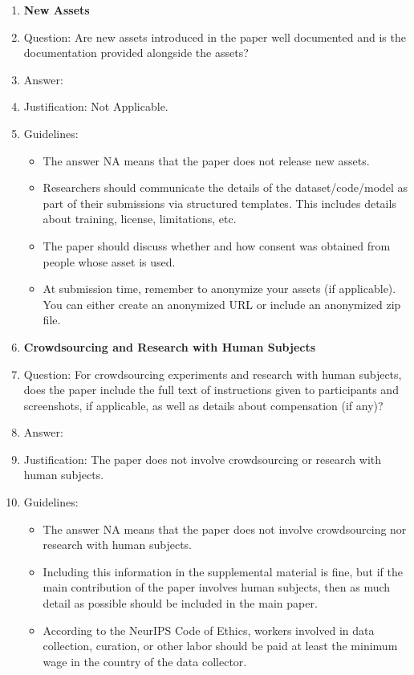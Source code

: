 \documentclass{article}
\theoremstyle{plain}
\theoremstyle{definition}
\theoremstyle{remark}
\begin{document}
\begin{enumerate}
\item {\bf New Assets}
    \item[] Question: Are new assets introduced in the paper well documented and is the documentation provided alongside the assets?
    \item[] Answer: \answerNA{} %
    \item[] Justification: Not Applicable. 
    \item[] Guidelines:
    \begin{itemize}
        \item The answer NA means that the paper does not release new assets.
        \item Researchers should communicate the details of the dataset/code/model as part of their submissions via structured templates. This includes details about training, license, limitations, etc. 
        \item The paper should discuss whether and how consent was obtained from people whose asset is used.
        \item At submission time, remember to anonymize your assets (if applicable). You can either create an anonymized URL or include an anonymized zip file.
    \end{itemize}

\item {\bf Crowdsourcing and Research with Human Subjects}
    \item[] Question: For crowdsourcing experiments and research with human subjects, does the paper include the full text of instructions given to participants and screenshots, if applicable, as well as details about compensation (if any)? 
    \item[] Answer: \answerNA{} %
    \item[] Justification: The paper does not involve crowdsourcing or research with human subjects.
    \item[] Guidelines: 
    \begin{itemize}
        \item The answer NA means that the paper does not involve crowdsourcing nor research with human subjects.
        \item Including this information in the supplemental material is fine, but if the main contribution of the paper involves human subjects, then as much detail as possible should be included in the main paper. 
        \item According to the NeurIPS Code of Ethics, workers involved in data collection, curation, or other labor should be paid at least the minimum wage in the country of the data collector. 
    \end{itemize}


\end{enumerate}
\end{document}
